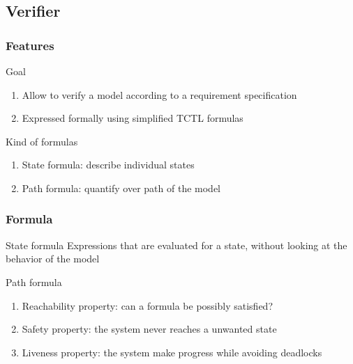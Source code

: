 \documentclass{bredelebeamer}
\begin{document}
\subsection{Verifier}
\begin{frame}
	\frametitle{Features}
	\begin{block}{Goal}
		\begin{enumerate}
			\item Allow to verify a model according to a requirement specification
			\item Expressed formally using simplified TCTL formulas
		\end{enumerate}
	\end{block}
	
	\begin{block}{Kind of formulas}
		\begin{enumerate}
			\item State formula: describe individual states
			\item Path formula: quantify over path of the model
		\end{enumerate}
	\end{block}
	
\end{frame}

\begin{frame}
	\frametitle{Formula}
	\begin{block}{State formula}
		Expressions that are evaluated for a state, without looking at the behavior of the model
	\end{block}
	
	\begin{block}{Path formula}
		\begin{enumerate}
			\item Reachability property: can a formula be possibly satisfied?
			\item Safety property: the system never reaches a unwanted state
			\item Liveness property: the system make progress while avoiding deadlocks
		\end{enumerate}
	\end{block}
	
\end{frame}
\end{document}
